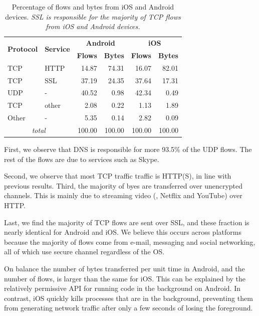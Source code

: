 \begin{table}
\begin{center}
\begin{tabular}{|l|l|r|r|r|r|}
\hline
\multirow{2}{*}{\bf Protocol} & \multirow{2}{*}{\bf Service} & \multicolumn{2}{|c|}{\bf Android} & \multicolumn{2}{|c|}{\bf iOS} \tabularnewline
\cline{3-6}
           &           &  \textbf{Flows}  &  \textbf{Bytes}  &  \textbf{Flows}  &  \textbf{Bytes}  \tabularnewline
\hline
 TCP       &  HTTP     &  14.87  &  74.31  &  16.07  &  82.01  \tabularnewline
\hline
TCP       &  SSL      &  37.19  &  24.35  &  37.64  &  17.31  \tabularnewline
\hline
 UDP       &  -        &  40.52  &   0.98  &  42.34  &   0.49  \tabularnewline
\hline
 TCP       &  other    &   2.08  &   0.22  &   1.13  &   1.89  \tabularnewline
\hline
 Other     &  -        &   5.35  &   0.14  &   2.82  &   0.09  \tabularnewline
\hline
\multicolumn{2}{|c|}{\emph{total}} & 100.00 & 100.00 & 100.00 & 100.00 \tabularnewline
\hline
\end{tabular}
\end{center}
\caption{Percentage of flows and bytes from iOS and Android devices.  \emph{SSL is responsible for the majority of
    TCP flows from iOS and Android devices.}} 
\label{tab:summaryIOSAndroidTraffic}
\end{table}

First, we observe that DNS is responsible for more 93.5\% of
the UDP flows. The rest of the flows are due to services such as
Skype. 

Second, we observe that most TCP traffic
traffic is HTTP(S), in line with previous results. Third, the majority 
of byes are transferred over unencrypted channels. This is mainly 
due to streaming video (\eg, Netflix and YouTube) over HTTP. 

Last, we find the majority 
of TCP flows are sent over SSL, and these fraction is nearly identical 
for Android and iOS. We believe this occurs across platforms because 
the majority of flows come from e-mail, messaging and social networking, 
all of which use secure channel regardless of the OS.  

On balance the number of bytes transferred per unit time in Android, 
and the number of flows, is larger than the same for iOS. This can be 
explained by the relatively permissive API for running code in the 
background on Android. In contrast, iOS quickly kills processes that 
are in the background, preventing them from generating network 
traffic after only a few seconds of losing the foreground.




